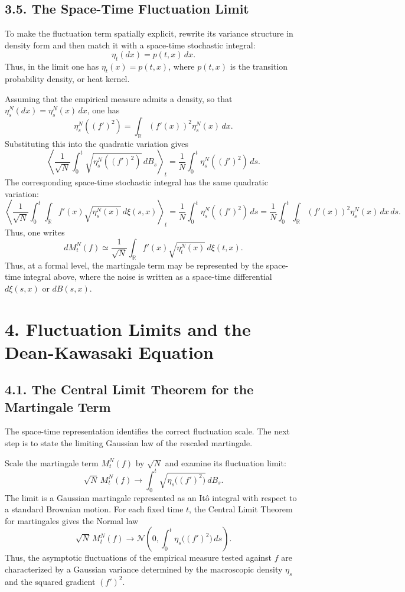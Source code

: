 \documentclass[11pt]{article}
\theoremstyle{definition}
\theoremstyle{remark}
\begin{document}
\subsection*{3.5. The Space-Time Fluctuation Limit}
To make the fluctuation term spatially explicit, rewrite its variance structure in density form and then match it with a space-time stochastic integral:
\[
\eta_t(dx)=p(t,x)\,dx.
\]
Thus, in the limit one has $\eta_t(x)=p(t,x)$, where $p(t,x)$ is the transition probability density, or heat kernel.

Assuming that the empirical measure admits a density, so that $\eta_s^N(dx)=\eta_s^N(x)\,dx$, one has
\[
\eta_s^N((f')^2)=\int_{\mathbb R} (f'(x))^2 \eta_s^N(x)\,dx.
\]
Substituting this into the quadratic variation gives
\[
\left\langle
\frac{1}{\sqrt{N}}\int_0^t \sqrt{\eta_s^N((f')^2)}\,dB_s
\right\rangle_t
=
\frac{1}{N}\int_0^t \eta_s^N((f')^2)\,ds.
\]
The corresponding space-time stochastic integral has the same quadratic variation:
\[
\left\langle
\frac{1}{\sqrt{N}}\int_0^t \int_{\mathbb R} f'(x)\sqrt{\eta_s^N(x)}\,d\xi(s,x)
\right\rangle_t
=
\frac{1}{N}\int_0^t \eta_s^N((f')^2)\,ds
=
\frac{1}{N}\int_0^t \int_{\mathbb R} (f'(x))^2 \eta_s^N(x)\,dx\,ds.
\]
Thus, one writes
\[
dM_t^N(f)\simeq \frac{1}{\sqrt{N}}\int_{\mathbb R} f'(x)\sqrt{\eta_t^N(x)}\,d\xi(t,x).
\]
Thus, at a formal level, the martingale term may be represented by the space-time integral above, where the noise is written as a space-time differential $d\xi(s,x)$ or $dB(s,x)$.

\section*{4. Fluctuation Limits and the Dean-Kawasaki Equation}
\subsection*{4.1. The Central Limit Theorem for the Martingale Term}
The space-time representation identifies the correct fluctuation scale. The next step is to state the limiting Gaussian law of the rescaled martingale.

Scale the martingale term $M_t^N(f)$ by $\sqrt{N}$ and examine its fluctuation limit:
\[
\sqrt{N}\,M_t^N(f)\to \int_0^t \sqrt{\eta_s\bigl((f')^2\bigr)}\,dB_s.
\]
The limit is a Gaussian martingale represented as an It\^o integral with respect to a standard Brownian motion. For each fixed time $t$, the Central Limit Theorem for martingales gives the Normal law
\[
\sqrt{N}\,M_t^N(f)\to \mathcal N\!\left(0,\int_0^t \eta_s\bigl((f')^2\bigr)\,ds\right).
\]
Thus, the asymptotic fluctuations of the empirical measure tested against $f$ are characterized by a Gaussian variance determined by the macroscopic density $\eta_s$ and the squared gradient $(f')^2$.
\end{document}
